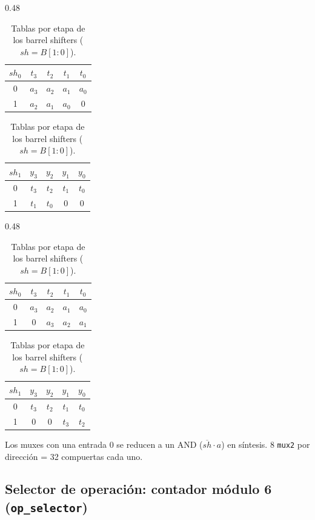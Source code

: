 \documentclass[11pt,a4paper]{article}
\newcommand{\sig}[1]{\texttt{#1}}
\newcommand{\nott}[1]{\overline{#1}}
\begin{document}
\begin{table}[H]
\centering
\begin{subtable}[t]{0.48\textwidth}\centering
\begin{tabular}{@{}c|cccc@{}}
\toprule
$sh_0$ & $t_3$ & $t_2$ & $t_1$ & $t_0$ \\
\midrule
0 & $a_3$ & $a_2$ & $a_1$ & $a_0$ \\ 1 & $a_2$ & $a_1$ & $a_0$ & 0 \\
\bottomrule
\end{tabular}\vspace{2pt}
\begin{tabular}{@{}c|cccc@{}}
\toprule
$sh_1$ & $y_3$ & $y_2$ & $y_1$ & $y_0$ \\
\midrule
0 & $t_3$ & $t_2$ & $t_1$ & $t_0$ \\ 1 & $t_1$ & $t_0$ & 0 & 0 \\
\bottomrule
\end{tabular}
\caption{Shift left}
\end{subtable}\hfill
\begin{subtable}[t]{0.48\textwidth}\centering
\begin{tabular}{@{}c|cccc@{}}
\toprule
$sh_0$ & $t_3$ & $t_2$ & $t_1$ & $t_0$ \\
\midrule
0 & $a_3$ & $a_2$ & $a_1$ & $a_0$ \\ 1 & 0 & $a_3$ & $a_2$ & $a_1$ \\
\bottomrule
\end{tabular}\vspace{2pt}
\begin{tabular}{@{}c|cccc@{}}
\toprule
$sh_1$ & $y_3$ & $y_2$ & $y_1$ & $y_0$ \\
\midrule
0 & $t_3$ & $t_2$ & $t_1$ & $t_0$ \\ 1 & 0 & 0 & $t_3$ & $t_2$ \\
\bottomrule
\end{tabular}
\caption{Shift right}
\end{subtable}
\caption{Tablas por etapa de los barrel shifters ($sh=B[1{:}0]$).}
\end{table}

Los muxes con una entrada 0 se reducen a un AND ($\nott{sh}\cdot a$) en síntesis. 8 \sig{mux2} por dirección = 32 compuertas cada uno.

\subsection{Selector de operación: contador módulo 6 (\sig{op\_selector})}
\end{document}
